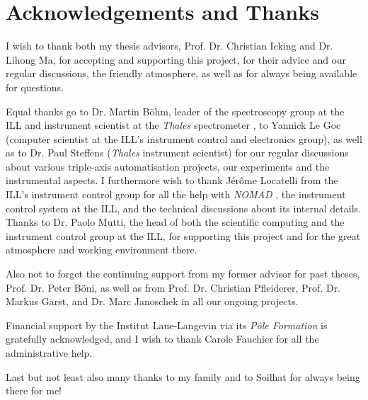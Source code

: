 %
%

\chapter*{Acknowledgements and Thanks}

I wish to thank both my thesis advisors, Prof. Dr. Christian Icking and Dr. Lihong Ma, for accepting
and supporting this project, for their advice and our regular discussions, the friendly atmosphere, 
as well as for always being available for questions.

Equal thanks go to Dr. Martin B\"ohm, leader of the spectroscopy group at the ILL and instrument
scientist at the \textit{Thales} spectrometer \cite{thales}, to Yannick Le Goc (computer scientist at the ILL's instrument
control and electronics group), as well as to Dr. Paul Steffens (\textit{Thales} instrument scientist) for our
regular discussions about various triple-axis automatisation projects, our experiments and the
instrumental aspects. I furthermore wish to thank Jérôme Locatelli from the ILL's instrument control group for
all the help with \textit{NOMAD} \cite{web_NOMAD}, the instrument control system at the ILL, and the technical discussions
about its internal details. 
Thanks to Dr. Paolo Mutti, the head of both the scientific computing and the instrument control group 
at the ILL, for supporting this project and for the great atmosphere and working environment there.

Also not to forget the continuing support from my former advisor for past theses, Prof. Dr. Peter B\"oni,
as well as from Prof. Dr. Christian Pfleiderer, Prof. Dr. Markus Garst, and Dr. Marc Janoschek in all our ongoing projects.

Financial support by the Institut Laue-Langevin via its \textit{P\^ole Formation} is gratefully acknowledged,
and I wish to thank Carole Fauchier for all the administrative help.

Last but not least also many thanks to my family and to Soilhat for always being there for me!
